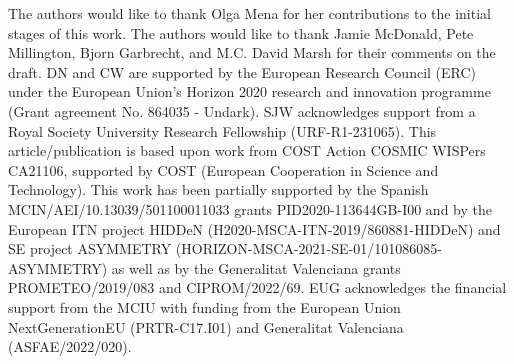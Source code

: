\documentclass[twocolumn,superscriptaddress,floatfix,preprintnumbers,prd,nofootinbib,aps,10pt]{revtex4-2}
\renewcommand\({\left(}
\renewcommand\){\right)}
\renewcommand\[{\left[}
\renewcommand\]{\right]}
\begin{document}
\begin{acknowledgments}
The authors would like to thank Olga Mena for her contributions to the initial stages of this work. The authors would like to thank Jamie McDonald, Pete Millington, Bjorn Garbrecht, and  M.C. David Marsh for their comments on the draft. DN and CW are supported by the European Research Council (ERC) under the European Union's Horizon 2020 research and innovation programme (Grant agreement No. 864035 - Undark). SJW acknowledges support from a Royal Society University Research Fellowship (URF-R1-231065). This article/publication is based upon work from COST Action COSMIC WISPers CA21106, supported by COST (European Cooperation in Science and Technology).
This work has been partially supported by the Spanish MCIN/AEI/10.13039/501100011033 grants PID2020-113644GB-I00 and by the European ITN project HIDDeN (H2020-MSCA-ITN-2019/860881-HIDDeN) and SE project ASYMMETRY (HORIZON-MSCA-2021-SE-01/101086085-ASYMMETRY) as well as by the Generalitat Valenciana grants PROMETEO/2019/083 and CIPROM/2022/69. EUG acknowledges the financial support from the MCIU with funding from the European Union NextGenerationEU (PRTR-C17.I01) and Generalitat Valenciana (ASFAE/2022/020).
\end{acknowledgments}










\end{document}
